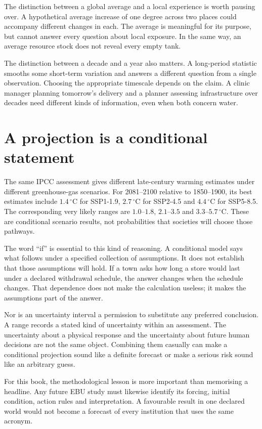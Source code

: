 The distinction between a global average and a local experience is worth pausing over. A hypothetical average increase of one degree across two places could accompany different changes in each. The average is meaningful for its purpose, but cannot answer every question about local exposure. In the same way, an average resource stock does not reveal every empty tank.

The distinction between a decade and a year also matters. A long-period statistic smooths some short-term variation and answers a different question from a single observation. Choosing the appropriate timescale depends on the claim. A clinic manager planning tomorrow's delivery and a planner assessing infrastructure over decades need different kinds of information, even when both concern water.

\section{A projection is a conditional statement}
The same IPCC assessment gives different late-century warming estimates under different greenhouse-gas scenarios. For 2081--2100 relative to 1850--1900, its best estimates include $1.4\,^{\circ}\mathrm{C}$ for SSP1-1.9, $2.7\,^{\circ}\mathrm{C}$ for SSP2-4.5 and $4.4\,^{\circ}\mathrm{C}$ for SSP5-8.5. The corresponding very likely ranges are $1.0$--$1.8$, $2.1$--$3.5$ and $3.3$--$5.7\,^{\circ}\mathrm{C}$. These are conditional scenario results, not probabilities that societies will choose those pathways.\cite{intro-ipcc}

The word ``if'' is essential to this kind of reasoning. A conditional model says what follows under a specified collection of assumptions. It does not establish that those assumptions will hold. If a town asks how long a store would last under a declared withdrawal schedule, the answer changes when the schedule changes. That dependence does not make the calculation useless; it makes the assumptions part of the answer.

Nor is an uncertainty interval a permission to substitute any preferred conclusion. A range records a stated kind of uncertainty within an assessment. The uncertainty about a physical response and the uncertainty about future human decisions are not the same object. Combining them casually can make a conditional projection sound like a definite forecast or make a serious risk sound like an arbitrary guess.

For this book, the methodological lesson is more important than memorising a headline. Any future EBU study must likewise identify its forcing, initial condition, action rules and interpretation. A favourable result in one declared world would not become a forecast of every institution that uses the same acronym.

